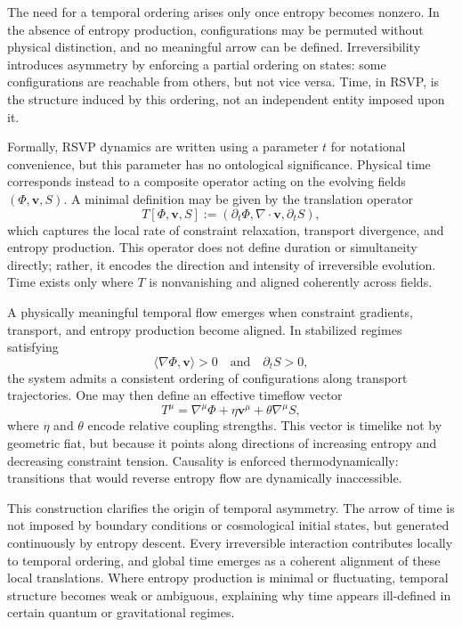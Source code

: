 \documentclass[11pt]{article}
\begin{document}
The need for a temporal ordering arises only once entropy becomes nonzero. In the absence of entropy production, configurations may be permuted without physical distinction, and no meaningful arrow can be defined. Irreversibility introduces asymmetry by enforcing a partial ordering on states: some configurations are reachable from others, but not vice versa. Time, in RSVP, is the structure induced by this ordering, not an independent entity imposed upon it.

Formally, RSVP dynamics are written using a parameter $t$ for notational convenience, but this parameter has no ontological significance. Physical time corresponds instead to a composite operator acting on the evolving fields $(\Phi, \mathbf{v}, S)$. A minimal definition may be given by the translation operator
\begin{equation}
T[\Phi, \mathbf{v}, S] := \left( \partial_t \Phi, \nabla \cdot \mathbf{v}, \partial_t S \right),
\end{equation}
which captures the local rate of constraint relaxation, transport divergence, and entropy production. This operator does not define duration or simultaneity directly; rather, it encodes the direction and intensity of irreversible evolution. Time exists only where $T$ is nonvanishing and aligned coherently across fields.

A physically meaningful temporal flow emerges when constraint gradients, transport, and entropy production become aligned. In stabilized regimes satisfying
\begin{equation}
\langle \nabla \Phi, \mathbf{v} \rangle > 0 \quad \text{and} \quad \partial_t S > 0,
\end{equation}
the system admits a consistent ordering of configurations along transport trajectories. One may then define an effective timeflow vector
\begin{equation}
T^\mu = \nabla^\mu \Phi + \eta \mathbf{v}^\mu + \theta \nabla^\mu S,
\end{equation}
where $\eta$ and $\theta$ encode relative coupling strengths. This vector is timelike not by geometric fiat, but because it points along directions of increasing entropy and decreasing constraint tension. Causality is enforced thermodynamically: transitions that would reverse entropy flow are dynamically inaccessible.

This construction clarifies the origin of temporal asymmetry. The arrow of time is not imposed by boundary conditions or cosmological initial states, but generated continuously by entropy descent. Every irreversible interaction contributes locally to temporal ordering, and global time emerges as a coherent alignment of these local translations. Where entropy production is minimal or fluctuating, temporal structure becomes weak or ambiguous, explaining why time appears ill-defined in certain quantum or gravitational regimes.
\end{document}
